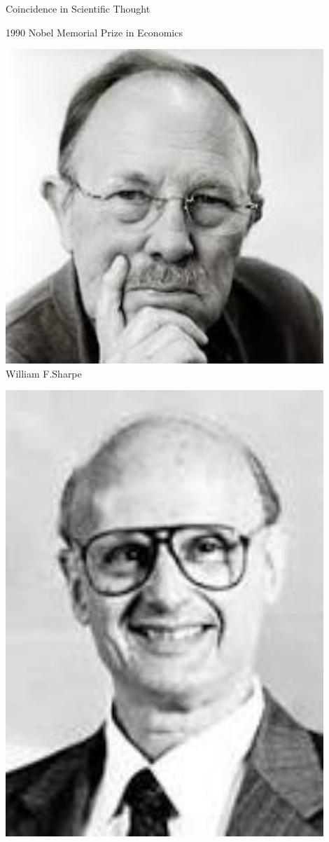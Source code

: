 \documentclass{beamer}
\begin{document}
\begin{frame}{Coincidence in Scientific Thought}
	\begin{block}{1990 Nobel Memorial Prize in Economics}
		\begin{minipage}[t]{0.3\textwidth}
			\centering
			\includegraphics[width=0.9\textwidth]{William.jpg}\\
			\alert{William F.Sharpe}
		\end{minipage}
		\begin{minipage}[t]{0.3\textwidth}
			\centering
			\includegraphics[width=0.9\textwidth]{Markowitz.jpg}\\

\end{minipage}
\end{block}
\end{frame}
\end{document}
